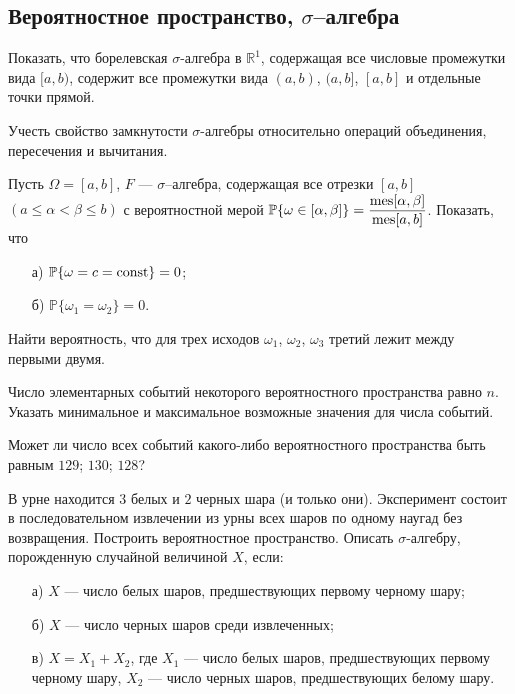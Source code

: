 \subsection{Вероятностное пространство, $\sigma$–алгебра}

\begin{problem}
Показать, что борелевская $\sigma$-алгебра в ${\mathbb R}^1$, содержащая все числовые промежутки вида $[a,b)$, 
содержит все промежутки вида $(a,b)$, $(a,b]$, $[a,b]$ и отдельные точки прямой. 

\begin{ordre}
Учесть свойство замкнутости $\sigma$-алгебры относительно операций 
объединения, пересечения и вычитания. 
\end{ordre}

\end{problem}


\begin{problem}
Пусть $\Omega = [a, b]$, $F$ --- $\sigma$–алгебра, содержащая все отрезки 
$[a,b]$ $(a \leqslant \alpha < \beta \leqslant b)$ с вероятностной мерой 
${\mathbb P}\{ \omega\in[\alpha,\beta]\}=\dfrac{\mathrm{mes}[\alpha, \beta]}{\mathrm{mes}[a,b]}$. 
Показать, что 
\begin{enumerate}
\item[а)] ${\mathbb P}\{ \omega=c=\mathop{\mathrm{const}}\nolimits\}=0$; 
\item[б)] ${\mathbb P}\{ \omega_1=\omega_2\}=0$. 
\end{enumerate}
Найти вероятность, что для трех исходов $\omega_1$, $\omega_2$, $\omega_3$ третий лежит между первыми двумя. 
\end{problem}


\begin{problem}
Число элементарных событий некоторого вероятностного пространства равно $n$. Указать минимальное и максимальное возможные значения 
для числа событий. 
\end{problem}

\begin{problem}
Может ли число всех событий какого-либо вероятностного пространства быть равным $129$; $130$; $128$? 
\end{problem}


\begin{problem}
В урне находится $3$ белых и $2$ черных шара (и только они). 
Эксперимент состоит в последовательном извлечении из урны всех шаров по одному наугад без возвращения. Построить вероятностное пространство. 
Описать $\sigma$-алгебру, порожденную случайной величиной $X$, если: 
\begin{enumerate}
\item[а)] $X$ --- число белых шаров, предшествующих первому черному шару; 
\item[б)] $X$ --- число черных шаров среди извлеченных; 
\item[в)] $X=X_1+X_2$, где $X_1$ --- число белых шаров, предшествующих первому черному шару, 
$X_2$ --- число черных шаров, предшествующих белому шару. 
\end{enumerate}
\end{problem}


